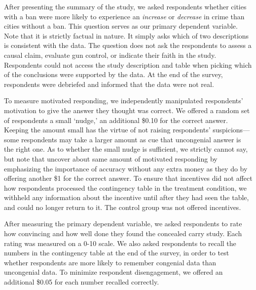 \documentclass[12pt, letterpaper]{article}
\begin{document}
After presenting the summary of the study, we asked respondents whether cities with a ban were more likely to experience an {\it increase} or {\it decrease} in crime than cities without a ban. This question serves as our primary dependent variable. Note that it is strictly factual in nature. It simply asks which of two descriptions is consistent with the data. The question does not ask the respondents to assess a causal claim, evaluate gun control, or indicate their faith in the study. Respondents could not access the study description and table when picking which of the conclusions were supported by the data. At the end of the survey, respondents were debriefed and informed that the data were not real.

To measure motivated responding, we independently manipulated respondents' motivation to give the answer they thought was correct. We offered a random set of respondents a small `nudge,' an additional \$0.10 for the correct answer.  Keeping the amount small has the virtue of not raising respondents' suspicions---some respondents may take a larger amount as cue that uncongenial answer is the right one. As to whether the small nudge is sufficient, we strictly cannot say, but note that \citet{prior2015} uncover about same amount of motivated responding by emphasizing the importance of accuracy without any extra money as they do by offering another \$1 for the correct answer. To ensure that incentives did not affect how respondents processed the contingency table in the treatment condition, we withheld any information about the incentive until after they had seen the table, and could no longer return to it. The control group was not offered incentives.

After measuring the primary dependent variable, we asked respondents to rate how convincing and how well done they found the concealed carry study. Each rating was measured on a 0-10 scale. We also asked respondents to recall the numbers in the contingency table at the end of the survey, in order to test whether respondents are more likely to remember congenial data than uncongenial data. To minimize respondent disengagement, we offered an additional \$0.05 for each number recalled correctly.
\end{document}
